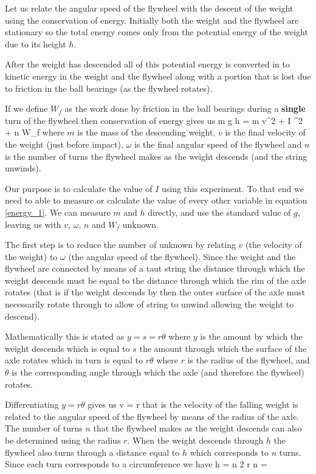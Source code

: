     Let us relate the angular speed of the flywheel with the descent of the weight using the conservation of energy. Initially both the weight and the flywheel are stationary so the total energy comes only from the potential energy of the weight due to its height $h$.

    After the weight has descended all of this potential energy is converted in to kinetic energy in the weight and the flywheel along with a portion that is lost due to friction in the ball bearings (as the flywheel rotates).

    If we define $W_f$ as the work done by friction in the ball bearings during a \textbf{single} turn of the flywheel then conservation of energy gives us
    \beq \label{energy_1}
        m g h =  m v^2 +  I \omega^2 + n W_f
    \eeq
    where $m$ is the mass of the descending weight, $v$ is the final velocity of the weight (just before impact), $\omega$ is the final angular speed of the flywheel and $n$ is the number of turns the flywheel makes as the weight descends (and the string unwinds).

    Our purpose is to calculate the value of $I$ using this experiment. To that end we need to able to measure or calculate the value of every other variable in equation \eqref{energy_1}. We can measure $m$ and $h$ directly, and use the standard value of $g$, leaving us with $v$, $\omega$, $n$ and $W_f$ unknown.

    The first step is to reduce the number of unknown by relating $v$ (the velocity of the weight) to $\omega$ (the angular speed of the flywheel). Since the weight and the flywheel are connected by means of a taut string the distance through which the weight descends must be equal to the distance through which the rim of the axle rotates (that is if the weight descends by  then the outer surface of the axle must necessarily rotate through  to allow  of string to unwind allowing the weight to descend).

    Mathematically this is stated as $y = s = r \theta$ where $y$ is the amount by which the weight descends which is equal to $s$ the amount through which the surface of the axle rotates which in turn is equal to $r \theta$ where $r$ is the radius of the flywheel, and $\theta$ is the corresponding angle through which the axle (and therefore the flywheel) rotates.

    Differentiating $y = r \theta$ gives us
    \beq \label{v_rw}
        v = r \omega
    \eeq
    that is the velocity of the falling weight is related to the angular speed of the flywheel by means of the radius of the axle. The number of turns $n$ that the flywheel makes as the weight descends can also be determined using the radius $r$. When the weight descends through $h$ the flywheel also turns through a distance equal to $h$ which corresponds to $n$ turns. Since each turn corresponds to a circumference we have
    \beq \label{h_nr}
        h = n 2 \pi r \imply n = 
    \eeq

